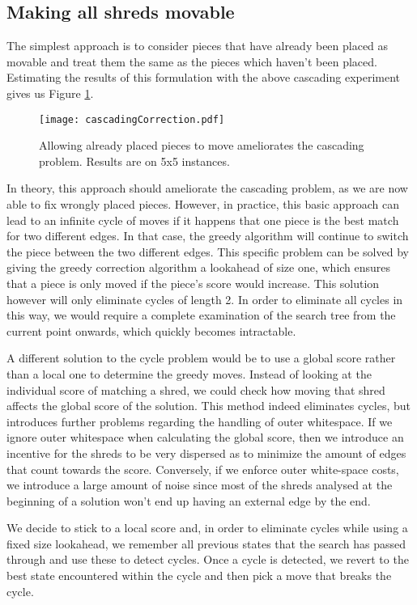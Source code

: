 \newpage
\subsection{Making all shreds movable}
The simplest approach is to consider pieces that have already been placed as movable and treat them the same as the pieces which haven't been placed. Estimating the results of this formulation with the above cascading experiment gives us Figure \ref{fig:cascCorr}.

\begin{figure}[h]
  \centering
  \texttt{[image: cascadingCorrection.pdf]}
  \caption{Allowing already placed pieces to move ameliorates the cascading problem. Results are on 5x5 instances.}
  \label{fig:cascCorr}
\end{figure}

In theory, this approach should ameliorate the cascading problem, as we are now able to fix wrongly placed pieces. However, in practice, this basic approach can lead to an infinite cycle of moves if it happens that one piece is the best match for two different edges. In that case, the greedy algorithm will continue to switch the piece between the two different edges. This specific problem can be solved by giving the greedy correction algorithm a lookahead of size one, which ensures that a piece is only moved if the piece's score would increase. This solution however will only eliminate cycles of length 2. In order to eliminate all cycles in this way, we would require a complete examination of the search tree from the current point onwards, which quickly becomes intractable.

A different solution to the cycle problem would be to use a global score rather than a local one to determine the greedy moves. Instead of looking at the individual score of matching a shred, we could check how moving that shred affects the global score of the solution. This method indeed eliminates cycles, but introduces further problems regarding the handling of outer whitespace. If we ignore outer whitespace when calculating the global score, then we introduce an incentive for the shreds to be very dispersed as to minimize the amount of edges that count towards the score. Conversely, if we enforce outer white-space costs, we introduce a large amount of noise since most of the shreds analysed at the beginning of a solution won't end up having an external edge by the end.

We decide to stick to a local score and, in order to eliminate cycles while using a fixed size lookahead, we remember all previous states that the search has passed through and use these to detect cycles. Once a cycle is detected, we revert to the best state encountered within the cycle and then pick a move that breaks the cycle.


